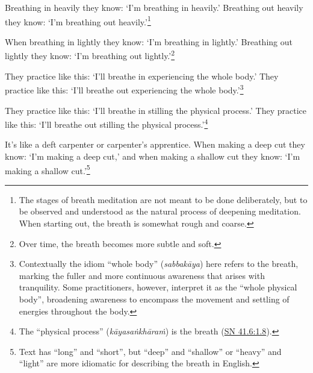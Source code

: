 \documentclass[12pt,openany]{book}%
\begin{document}
Breathing in heavily they know: ‘I’m breathing in heavily.’ Breathing out heavily they know: ‘I’m breathing out heavily.’\footnote{The stages of breath meditation are not meant to be done deliberately, but to be observed and understood as the natural process of deepening meditation. When starting out, the breath is somewhat rough and coarse. } 

When breathing in lightly they know: ‘I’m breathing in lightly.’ Breathing out lightly they know: ‘I’m breathing out lightly.’\footnote{Over time, the breath becomes more subtle and soft. } 

They practice like this: ‘I’ll breathe in experiencing the whole body.’ They practice like this: ‘I’ll breathe out experiencing the whole body.’\footnote{Contextually the idiom “whole body” (\textit{\textsanskrit{sabbakāya}}) here refers to the breath, marking the fuller and more continuous awareness that arises with tranquility. Some practitioners, however, interpret it as the “whole physical body”, broadening awareness to encompass the movement and settling of energies throughout the body. } 

They practice like this: ‘I’ll breathe in stilling the physical process.’ They practice like this: ‘I’ll breathe out stilling the physical process.’\footnote{The “physical process” (\textit{\textsanskrit{kāyasaṅkhāraṁ}}) is the breath (\href{https://suttacentral.net/sn41.6/en/sujato\#1.8}{SN 41.6:1.8}). } 

It’s like a deft carpenter or carpenter’s apprentice. When making a deep cut they know: ‘I’m making a deep cut,’ and when making a shallow cut they know: ‘I’m making a shallow cut.’\footnote{Text has “long” and “short”, but “deep” and “shallow” or “heavy” and “light” are more idiomatic for describing the breath in English. } 
\end{document}
